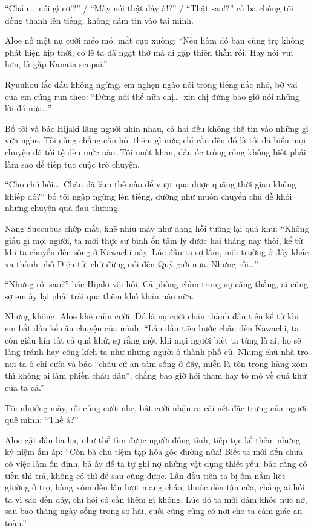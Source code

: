 \documentclass[../main.tex]{subfiles}
\begin{document}
``Cháu\dots\ nói gì cơ!?'' / ``Mày nói thật đấy à!?'' / ``Thật sao!?'' cả ba chúng tôi đồng thanh lên tiếng, không dám tin vào tai mình.

Aloe nở một nụ cười méo mó, mắt cụp xuống: ``Nếu hôm đó bạn cùng trọ không phát hiện kịp thời, có lẽ ta đã ngạt thở mà đi gặp thiên thần rồi. Hay nói vui hơn, là gặp Kanata-senpai.''

Ryuuhou lắc đầu không ngừng, em nghẹn ngào nói trong tiếng nấc nhỏ, bờ vai của em cũng run theo: ``Đừng nói thế nữa chị\dots\ xin chị đừng bao giờ nói những lời đó nữa\dots''

Bố tôi và bác Hijaki lặng người nhìn nhau, cả hai đều không thể tin vào những gì vừa nghe. Tôi cũng chẳng cần hỏi thêm gì nữa; chỉ cần đến đó là tôi đã hiểu mọi chuyện đã tồi tệ đến mức nào. Tôi nuốt khan, đầu óc trống rỗng không biết phải làm sao để tiếp tục cuộc trò chuyện.

``Cho chú hỏi\dots\ Cháu đã làm thế nào để vượt qua được quãng thời gian khủng khiếp đó?'' bố tôi ngập ngừng lên tiếng, dường như muốn chuyển chủ đề khỏi những chuyện quá đau thương.

Nàng Succubus chớp mắt, khẽ nhíu mày như đang hồi tưởng lại quá khứ: ``Không giấu gì mọi người, ta mới thực sự bình ổn tâm lý được hai tháng nay thôi, kể từ khi ta chuyển đến sống ở Kawachi này. Lúc đầu ta sợ lắm, môi trường ở đây khác xa thành phố Điện tử, chứ đừng nói đến Quỷ giới nữa. Nhưng rồi\dots''

``Nhưng rồi sao?'' bác Hijaki vội hỏi. Cả phòng chìm trong sự căng thẳng, ai cũng sợ em ấy lại phải trải qua thêm khó khăn nào nữa.

Nhưng không. Aloe khẽ mỉm cười. Đó là nụ cười chân thành đầu tiên kể từ khi em bắt đầu kể câu chuyện của mình: ``Lần đầu tiên bước chân đến Kawachi, ta còn giấu kín tất cả quá khứ, sợ rằng một khi mọi người biết ta từng là ai, họ sẽ lảng tránh hay công kích ta như những người ở thành phố cũ. Nhưng chủ nhà trọ nơi ta ở chỉ cười và bảo ``cháu cứ an tâm sống ở đây, miễn là tôn trọng hàng xóm thì không ai làm phiền cháu đâu'', chẳng bao giờ hỏi thăm hay tò mò về quá khứ của ta cả.''

Tôi nhướng mày, rồi cũng cười nhẹ, bật cười nhận ra cái nét đặc trưng của người quê mình: ``Thế á?''

Aloe gật đầu lia lịa, như thể tìm được người đồng tình, tiếp tục kể thêm những kỷ niệm ấm áp: ``Còn bà chủ tiệm tạp hóa góc đường nữa! Biết ta mới đến chưa có việc làm ổn định, bà ấy để ta tự ghi nợ những vật dụng thiết yếu, bảo rằng có tiền thì trả, không có thì để sau cũng được. Lần đầu tiên ta bị ốm nằm liệt giường ở trọ, hàng xóm đều lần lượt mang cháo, thuốc đến tận cửa, chẳng ai hỏi ta vì sao đến đây, chỉ hỏi có cần thêm gì không. Lúc đó ta mới dám khóc nức nở, sau bao tháng ngày sống trong sợ hãi, cuối cùng cũng có nơi cho ta cảm giác an toàn.''
\end{document}
